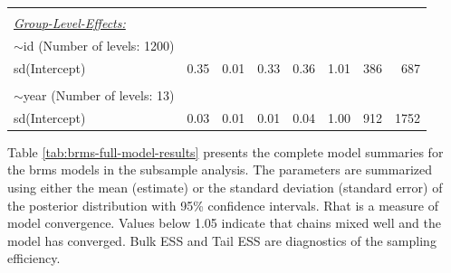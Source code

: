 \documentclass[12pt,twoside]{reedthesis}
\begin{document}
\begin{longtable}[c]{lrrrrrrr}
 &  &  &  &  &  &  &  \\
{\ul \textit{Group-Level-Effects:}} &  &  &  &  &  &  &  \\
$\sim$id (Number of levels: 1200) &  &  &  &  &  &  &  \\
sd(Intercept) & 0.35 & 0.01 & 0.33 & 0.36 & 1.01 & 386 & 687 \\
 &  &  &  &  &  &  &  \\
$\sim$year (Number of levels: 13) &  &  &  &  &  &  &  \\
sd(Intercept) & 0.03 & 0.01 & 0.01 & 0.04 & 1.00 & 912 & 1752 \\ \hline
\end{longtable}
\normalsize

\noindent
Table \ref{tab:brms-full-model-results} presents the complete model summaries for the brms models in the subsample analysis. The parameters are summarized using either the mean (estimate) or the standard deviation (standard error) of the posterior distribution with 95\% confidence intervals. Rhat is a measure of model convergence. Values below 1.05 indicate that chains mixed well and the model has converged. Bulk ESS and Tail ESS are diagnostics of the sampling efficiency.
\end{document}
